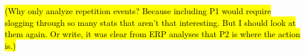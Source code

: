 \hl{(Why only analyze repetition events? Because including P1 would require slogging through so many stats that aren't that interesting. But I should look at them again.  Or write, it was clear from ERP analyses that P2 is where the action is.)}



